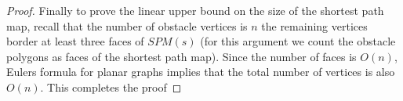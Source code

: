 \begin{proof}
	Finally to prove the linear upper bound on the size of the shortest path
	map, recall that the number of obstacle vertices is $n$ the remaining
	vertices border at least three faces of $SPM(s)$ (for this argument we count
	the obstacle polygons as faces of the shortest path map). Since the number
	of faces is $O(n)$, Eulers formula for planar graphs implies that the total
	number of vertices is also $O(n)$. This completes the proof
\end{proof}

